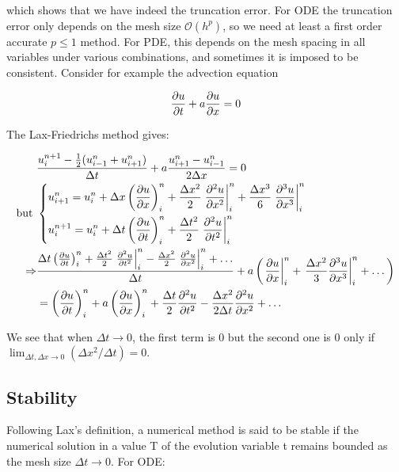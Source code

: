 which shows that we have indeed the truncation error. For ODE the truncation error only depends on the mesh size $\mathcal{O}(h^p)$, so we need at least a first order accurate $p\leq 1$ method. For PDE, this depends on the mesh spacing in all variables under various combinations, and sometimes it is imposed to be consistent. Consider for example the advection equation

\begin{equation}
\frac{\partial u}{\partial t} + a\frac{\partial u }{\partial x} = 0
\end{equation}

The Lax-Friedrichs method gives: 

\begin{equation}
\begin{aligned}
&\frac{u_i^{n+1}-\frac{1}{2}(u_{i-1}^n+u_{i+1}^n)}{\Delta t} + a \frac{u_{i+1}^n - u_{i-1}^n}{2\Delta x} = 0 \\ 
\mbox{but } &\left\{
\begin{aligned}
&u_{i+1}^n = u_i ^n + \Delta x \left(\frac{\partial u}{\partial x} \right)^n_i + \frac{\Delta x^2}{2} \left.\frac{\partial ^2 u}{\partial x^2} \right|^n_i + \frac{\Delta x^3}{6} \left.\frac{\partial ^3 u}{\partial x^3} \right|^n_i\\
&u_{i}^{n+1} = u_i ^n + \Delta t \left(\frac{\partial u}{\partial t} \right)^n_i + \frac{\Delta t^2}{2} \left.\frac{\partial ^2 u}{\partial t^2} \right|^n_i
\end{aligned}
\right.\\
\Rightarrow &\frac{\Delta t \left(\frac{\partial u}{\partial t} \right)^n_i + \frac{\Delta t^2}{2} \left.\frac{\partial ^2 u}{\partial t^2} \right|^n_i - \frac{\Delta x^2}{2} \left.\frac{\partial ^2 u}{\partial x^2} \right|^n_i + \dots}{\Delta t} + a \left( \left.\frac{\partial u}{\partial x}\right|^n_i + \left.\frac{\Delta x^2}{3} \frac{\partial ^3 u }{\partial x^3}\right|^n_i  + \dots \right) \\
&= \left(\frac{\partial u }{\partial t} \right)^n_i + a \left(\frac{\partial u}{\partial x}\right)^n_i + \frac{\Delta t }{2} \frac{\partial ^2 u}{\partial t^2} - \frac{\Delta x^2}{2\Delta t} \frac{\partial ^2 u}{\partial x^2} + \dots
\end{aligned}
\end{equation}

We see that when $\Delta t \rightarrow 0$, the first term is 0 but the second one is 0 only if $\lim _{\Delta t, \Delta x \rightarrow 0}(\Delta x^2 /\Delta t) = 0$. 

\subsection{Stability}
Following Lax's definition, a numerical method is said to be stable if the numerical solution in a value T of the evolution variable t remains bounded as the mesh size $\Delta t \rightarrow 0$. For ODE: 

